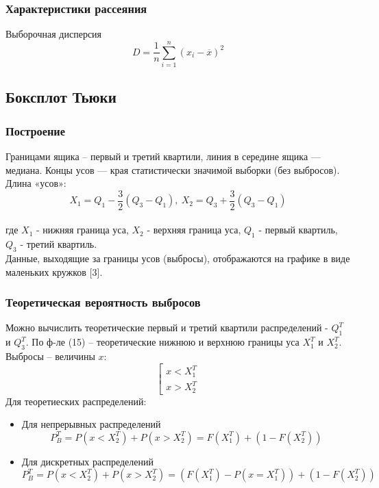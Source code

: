 	\subsubsection {Характеристики рассеяния}
		Выборочная дисперсия \\
		\begin{equation}D = \frac{1}{n}\sum_{i=1}^{n}(x_i-\overline{x})^2\end{equation}

\subsection {Боксплот Тьюки}
	\subsubsection {Построение}
		Границами ящика – первый и третий квартили, линия в середине ящика — медиана. Концы усов — края статистически значимой выборки (без выбросов). Длина «усов»:\\
			\begin{equation}X_1 = Q_1 - \frac{3}{2}(Q_3 - Q_1),\ X_2 = Q_3 + \frac{3}{2}(Q_3 - Q_1)\end{equation} \\ 
		где $X_1$ - нижняя граница уса, $X_2$ - верхняя граница уса, $Q_1$ - первый квартиль, $Q_3$ - третий квартиль.\\
			Данные, выходящие за границы усов (выбросы), отображаются на графике
в виде маленьких кружков [3].

	\subsubsection {Теоретическая вероятность выбросов}
		Можно вычислить теоретические первый и третий квартили распределений - $Q_1^T$ и $Q_3^T$. По ф-ле (15) – теоретические нижнюю и верхнюю границы уса $X_1^T$ и $X_2^T$.  Выбросы – величины $x$:\\
	\begin{equation}
		\left[
			\begin{gathered}
				x < X_1^T \\
				x > X_2^T
			\end{gathered}
		\right.
	 \end{equation}
	Для теоретиеских распределений:\\
	\begin{itemize}
		\item {Для непрерывных распределений\\ 
				\begin{equation} P_B^T = P(x < X_2^T) + P(x > X_2^T) = F(X_1^T) + (1 - F(X_2^T)) \end{equation}}
		
		\item {Для дискретных распределений\\
				\begin{equation} P_B^T = P(x < X_2^T) + P(x > X_2^T) = (F(X_1^T) - P(x = X_1^T)) + (1 - F(X_2^T)) \end{equation}}
	\end{itemize}


